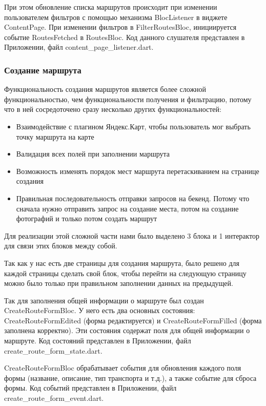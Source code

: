 При этом обновление списка маршрутов происходит при изменении пользователем фильтров с помощью механизма BlocListener в виджете ContentPage. При изменении фильтров в FilterRoutesBloc, инициируется событие RoutesFetched в RoutesBloc. Код данного слушателя представлен в Приложении, файл content\_page\_listener.dart.

\subsubsection*{Создание маршрута}
Функциональность создания маршрутов является более сложной функциональностью, чем функциональности получения и фильтрацию, потому что в ней сосредоточено сразу несколько других функциональностей:

\begin{itemize}
    \item Взаимодействие с плагином Яндекс.Карт, чтобы пользователь мог выбрать точку маршрута на карте
    \item Валидация всех полей при заполнении маршрута
    \item Возможность изменять порядок мест маршрута перетаскиванием на странице создания
    \item Правильная последовательность отправки запросов на бекенд. Потому что сначала нужно отправить запрос на создание места, потом на создание фотографий и только потом создать маршрут
\end{itemize}

Для реализации этой сложной части нами было выделено 3 блока и 1 интерактор для связи этих блоков между собой.

Так как у нас есть две страницы для создания маршрута, было решено для каждой страницы сделать свой блок, чтобы перейти на следующую страницу можно было только при правильном заполнении данных на предыдущей. 

Так для  заполнения общей информации о маршруте был создан CreateRouteFormBloc. У него есть два основных состояния: CreateRouteFormEdited (форма редактируется) и CreateRouteFormFilled (форма заполнена корректно). Эти состояния содержат поля для общей информации о маршруте. Код состояний представлен в Приложении, файл create\_route\_form\_state.dart.

CreateRouteFormBloc обрабатывает события для обновления каждого поля формы (название, описание, тип транспорта и т.д.), а также событие для сброса формы. Код событий представлен в Приложении, файл create\_route\_form\_event.dart.

